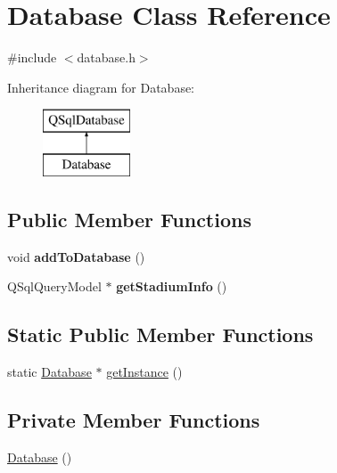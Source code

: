 \hypertarget{class_database}{}\section{Database Class Reference}
\label{class_database}


{\ttfamily \#include $<$database.\+h$>$}

Inheritance diagram for Database\+:\begin{figure}[H]
\begin{center}
\leavevmode
\includegraphics[height=2.000000cm]{class_database}
\end{center}
\end{figure}
\subsection*{Public Member Functions}
\begin{DoxyCompactItemize}
\item 
\mbox{\label{class_database_a76a9b0363174bdd6c70a052a088cfaf8}} 
void {\bfseries add\+To\+Database} ()
\item 
\mbox{\label{class_database_a94df9dbb511243da5a288eefc17348cb}} 
Q\+Sql\+Query\+Model $\ast$ {\bfseries get\+Stadium\+Info} ()
\end{DoxyCompactItemize}
\subsection*{Static Public Member Functions}
\begin{DoxyCompactItemize}
\item 
static \hyperlink{class_database}{Database} $\ast$ \hyperlink{class_database_a5a3b028f980a577ea0b809eb92312761}{get\+Instance} ()
\end{DoxyCompactItemize}
\subsection*{Private Member Functions}
\begin{DoxyCompactItemize}
\item 
\hyperlink{class_database_a4703c80e6969d33565ea340f768fdadf}{Database} ()
\end{DoxyCompactItemize}
